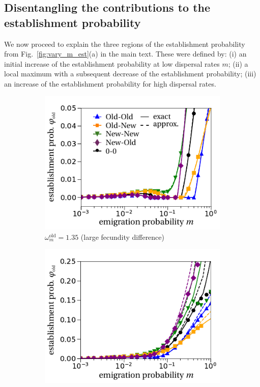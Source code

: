 \documentclass[11pt]{article}
\newcommand{\chg}[1]{\textcolor{change}{#1}}
\begin{document}
\subsection{Disentangling the contributions to the establishment probability \label{sec:SI_contributions}}
\chg{We now proceed to explain} the three regions of the establishment probability from Fig.~\ref{fig:vary_m_est}(a) in the main text. These were defined by: (i) an initial increase of the establishment probability at low dispersal rates $m$; (ii) a local maximum with a subsequent decrease of the establishment probability; (iii) an increase of the establishment probability for high dispersal rates. 

\begin{figure}[t!]
	\centering
	\begin{subfigure}{.5\textwidth}
		\centering
		\includegraphics[width=\linewidth]{fig2a.pdf}
		\caption{$\omega^\text{old}_m=1.35$ (large fecundity difference)}
	\end{subfigure}%
	\begin{subfigure}{.5\textwidth}
		\centering
		\includegraphics[width=\linewidth]{fig2c.pdf}

\end{subfigure}
\end{figure}
\end{document}

